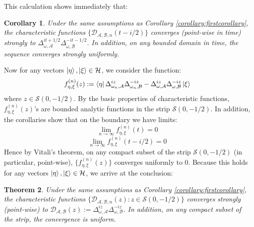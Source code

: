 \documentclass[a4paper,11pt]{article}
\newtheorem{theorem}{Theorem}
\newtheorem{corollary}[theorem]{Corollary}
\theoremstyle{definition}
\begin{document}
This calculation shows immediately that:
\begin{corollary}
    Under the same assumptions as Corollary \ref{corollary:firstcorollary}, the characteristic functions $\{\mathcal{D}_{\mathcal{A}, \mathcal{B}, n}(t-i/2)\}$ converges (point-wise in time) strongly to $\Delta_{\omega,\mathcal{A}}^{it + 1/2}\Delta_{\omega, \mathcal{B}}^{-it - 1/2}$. In addition, on any bounded domain in time, the sequence converges strongly uniformly.
\end{corollary}
Now for any vectors $\ket{\eta}, \ket{\xi}\in\mathcal{H}$, we consider the function:
\begin{equation}
    f^{(n)}_{\eta,\xi}(z) := \bra{\eta}\Delta^{iz}_{\omega_n,\mathcal{A}}\Delta^{-iz}_{\omega_n, \mathcal{B}} - \Delta^{iz}_{\omega,\mathcal{A}}\Delta^{-iz}_{\omega,\mathcal{B}}\ket{\xi}
\end{equation}
where $z\in\mathcal{S}(0,-1/2)$. By the basic properties of characteristic functions, $f^{(n)}_{\eta,\xi}(z)$'s are bounded analytic functions in the strip $\mathcal{S}(0, -1/2)$. In addition, the corollaries show that on the boundary we have limits:
\begin{equation}
    \lim_{n\rightarrow\infty}f^{(n)}_{\eta,\xi}(t) = 0
\end{equation}
\begin{equation}
    \lim_{n\rightarrow\infty}f^{(n)}_{\eta, \xi}(t - i/2) = 0
\end{equation}
Hence by Vitali's theorem, on any compact subset of the strip $\mathcal{S}(0, -1/2)$ (in particular, point-wise), $\{f^{(n)}_{\eta,\xi}(z)\}$ converges uniformly to $0$. Because this holds for any vectors $\ket{\eta}, \ket{\xi}\in\mathcal{H}$, we arrive at the conclusion:
\begin{theorem}
    Under the same assumptions as Corollary \ref{corollary:firstcorollary}, the characteristic functions $\{\mathcal{D}_{\mathcal{A}, \mathcal{B},n}(z):z\in\mathcal{S}(0, -1/2)\}$ converges strongly (point-wise) to $\mathcal{D}_{\mathcal{A}, \mathcal{B}}(z):=\Delta_{\omega,\mathcal{A}}^{iz}\Delta_{\omega,\mathcal{B}}^{-iz}$. In addition, on any compact subset of the strip, the convergence is uniform.
\end{theorem}
\end{document}
